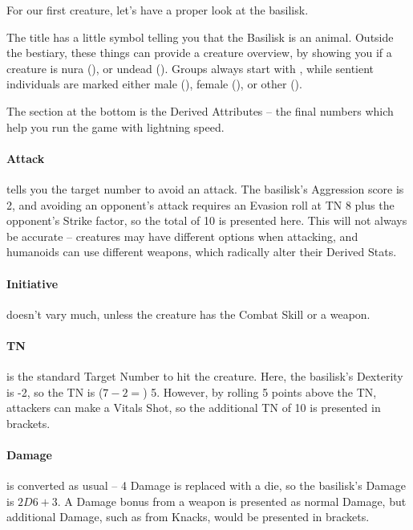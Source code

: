 \begin{multicols}{2}

\noindent
For our first creature, let's have a proper look at the basilisk.

\basilisk

The title has a little symbol telling you that the Basilisk is an animal.
Outside the bestiary, these things can provide a creature overview, by showing you if a creature is  nura (\N), or undead (\D).
Groups always start with \T, while sentient individuals are marked either male (\M), female (\F), or other (\E).

The section at the bottom is the Derived Attributes -- the final numbers which help you run the game with lightning speed.

\paragraph{Attack} tells you the target number to avoid an attack.  The basilisk's Aggression score is 2, and avoiding an opponent's attack requires an Evasion roll at TN 8 plus the opponent's Strike factor, so the total of 10 is presented here.  This will not always be accurate -- creatures may have different options when attacking, and humanoids can use different weapons, which radically alter their Derived Stats.

\paragraph{Initiative} doesn't vary much, unless the creature has the Combat Skill or a weapon.

\paragraph{TN} is the standard Target Number to hit the creature.  Here, the basilisk's Dexterity is -2, so the TN is ($7 - 2 =$) 5.  However, by rolling 5 points above the TN, attackers can make a Vitals Shot, so the additional TN of 10 is presented in brackets.

\paragraph{Damage} is converted as usual -- 4 Damage is replaced with a die, so the basilisk's Damage is $2D6+3$.  A Damage bonus from a weapon is presented as normal Damage, but additional Damage, such as from Knacks, would be presented in brackets.


\end{multicols}
